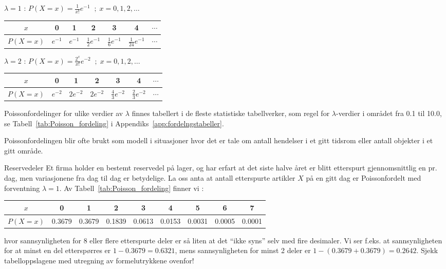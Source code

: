 \noindent $\lambda =1$ : $P(X=x)=\frac{{1}}{x!}e^{-1} \;\; ;\;x=0,1,2, \ldots $ \\
\begin{center}
\begin{tabular}{c|cccccc}
    $x$   &  0   &  1   &   2   &   3    &  4   & $\cdots$ \\ \hline
 $P(X=x)$ &$e^{-1}$&$e^{-1}$&$\frac{1}{2}e^{-1}$&
     $\frac{1}{6}e^{-1}$&$\frac{1}{24}e^{-1}$&$\cdots$
\end{tabular}
\end{center}
\noindent $\lambda =2$ : $P(X=x)=\frac{2^x}{x!}e^{-2} \;\; ;\;x=0,1,2, \ldots $
\begin{center}
\begin{tabular}{c|cccccc}
    $x$   &  0   &  1   &   2   &   3   &  4  & $\cdots$ \\ \hline
 $P(X=x)$ &$e^{-2}$&$2e^{-2}$&$2e^{-2}$&
     $\frac{4}{3}e^{-2}$&$\frac{2}{3}e^{-2}$&$\cdots$
\end{tabular}
\end{center}

\noindent Poissonfordelinger for ulike verdier av $\lambda$ finnes
tabellert i de fleste statistiske tabellverker, som regel for
$\lambda$-verdier i området fra 0.1 til 10.0, se Tabell~\ref{tab:Poisson_fordeling} i
Appendiks~\ref{app:fordelngstabeller}.

Poissonfordelingen blir ofte brukt som modell i situasjoner hvor
det er tale om antall hendelser i et gitt tidsrom eller antall
objekter i et gitt område. \\

\begin{eksempel}{Reservedeler}
Et firma holder en bestemt reservedel på lager, og har erfart at
det siste halve året er blitt etterspurt gjennomsnittlig en pr.
dag, men variasjonene fra dag til dag er betydelige. La oss anta
at antall etterspurte artikler $X$ på en gitt dag er
Poissonfordelt med forventning $\lambda =1$. Av Tabell~\ref{tab:Poisson_fordeling} finner vi :

\begin{center} \small \addtolength{\tabcolsep}{-0.5\tabcolsep}
\begin{tabular}{c|cccccccc}
    $x$  &  0  &  1   &   2  &  3  &  4  &  5  &  6  &  7  \\ \hline
 $P(X=x)$&0.3679&0.3679&0.1839&0.0613&0.0153&0.0031&0.0005&0.0001
\end{tabular}
\end{center}
\noindent hvor sannsynligheten for 8 eller flere etterspurte deler er så
liten at det ``ikke syns'' selv med fire desimaler. Vi ser f.eks.
at sannsynligheten for at minst en del etterspørres er $1 -
0.3679 = 0.6321$, mens sannsynligheten for minst 2 deler er $1 -
(0.3679 + 0.3679) = 0.2642$.
Sjekk tabelloppslagene med utregning av formelutrykkene ovenfor!
\end{eksempel}

